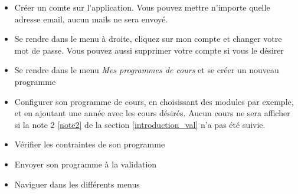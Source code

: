 \begin{itemize}

  \item Créer un comte sur l'application. Vous pouvez mettre n'importe quelle adresse email, aucun mails ne sera envoyé. 
  \item Se rendre dans le menu à droite, cliquez sur mon compte et changer votre mot de passe. Vous pouvez aussi supprimer votre compte si vous le désirer
  \item Se rendre dans le menu \textit{Mes programmes de cours} et se créer un nouveau programme
  \item Configurer son programme de cours, en choisissant des modules par exemple, et en ajoutant une année avec les cours désirés. Aucun cours ne sera afficher si la note 2 \ref{note2} de la section \ref{introduction_val} n'a pas été suivie. 
  \item Vérifier les contraintes de son programme
  \item Envoyer son programme à la validation
  \item Naviguer dans les différents menus

\end{itemize}